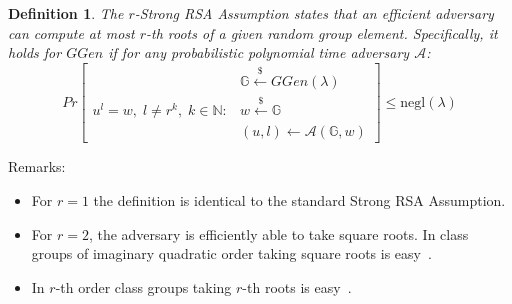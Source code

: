 \documentclass[a4paper]{article}
\newtheorem{definition}{Definition}
\begin{document}
\begin{definition}
The \emph{$r$-Strong RSA Assumption} states that an 
efficient adversary can compute at most $r$-th roots of a given random group element. Specifically,
it holds for $GGen$ if for any probabilistic polynomial time adversary $\mathcal{A}$:
$$
Pr
\begin{bmatrix}
&\mathbb{G}\xleftarrow{\$}GGen(\lambda)\\
u^l = w,\; l\neq r^k,\;k\in\mathbb{N} :
& w\xleftarrow{\$}\mathbb{G}\\
&(u,l) \xleftarrow{} \mathcal{A}(\mathbb{G},w)
\end{bmatrix}\leq \mathrm{negl}(\lambda)
$$
\end{definition}
Remarks:
\begin{itemize}
    \item For $r = 1$ the definition is identical to the standard Strong RSA Assumption. 
    \item For $r = 2$, the adversary
is efficiently able to take square roots. In class groups of imaginary quadratic order taking
square roots is easy~\cite{cryptoeprint:2019:1229}.
    \item In $r$-th order class groups taking $r$-th roots is easy~\cite{cryptoeprint:2019:1229}.
    \end{itemize}
\end{document}

